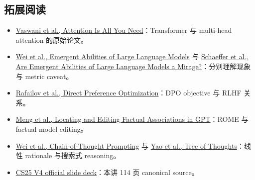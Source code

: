 \documentclass[a4paper]{article}
\begin{document}
\subsection{拓展阅读}

\begin{itemize}
  \item \href{https://arxiv.org/abs/1706.03762}{Vaswani et al., Attention Is All You Need}：Transformer 与 multi-head attention 的原始论文。
  \item \href{https://arxiv.org/abs/2206.07682}{Wei et al., Emergent Abilities of Large Language Models} 与 \href{https://arxiv.org/abs/2304.15004}{Schaeffer et al., Are Emergent Abilities of Large Language Models a Mirage?}：分别理解现象与 metric caveat。
  \item \href{https://arxiv.org/abs/2305.18290}{Rafailov et al., Direct Preference Optimization}：DPO objective 与 RLHF 关系。
  \item \href{https://arxiv.org/abs/2202.05262}{Meng et al., Locating and Editing Factual Associations in GPT}：ROME 与 factual model editing。
  \item \href{https://arxiv.org/abs/2201.11903}{Wei et al., Chain-of-Thought Prompting} 与 \href{https://arxiv.org/abs/2305.10601}{Yao et al., Tree of Thoughts}：线性 rationale 与搜索式 reasoning。
  \item \href{https://docs.google.com/presentation/d/1oXPs3LXtIVIsVbwTyGjAWj_aWvak9c1uNC4uhkS6glk/edit}{CS25 V4 official slide deck}：本讲 114 页 canonical source。
\end{itemize}
\end{document}

